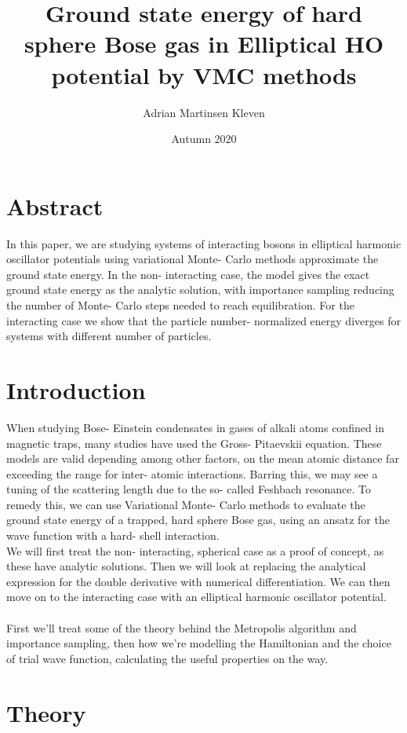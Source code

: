 \documentclass[11pt,a4paper,titlepage]{article}
\title{Ground state energy of hard sphere Bose gas in Elliptical HO potential by VMC methods}
\author{Adrian Martinsen Kleven}
\date{Autumn 2020}
\begin{document}
\maketitle
\tableofcontents
\listoffigures
\listoftables
\clearpage
\section{Abstract}
In this paper, we are studying systems of interacting bosons in elliptical harmonic oscillator potentials using variational Monte- Carlo methods approximate the ground state energy. In the non- interacting case, the model gives the exact ground state energy as the analytic solution, with importance sampling reducing the number of Monte- Carlo steps needed to reach equilibration. For the interacting case we show that the particle number- normalized energy diverges for systems with different number of particles.

\section{Introduction}
When studying Bose- Einstein condensates in gases of alkali atoms confined in magnetic traps, many studies have used the Gross- Pitaevskii equation. These models are valid depending among other factors, on the mean atomic distance far exceeding the range for inter- atomic interactions. Barring this, we may see a tuning of the scattering length due to the so- called Feshbach resonance. To remedy this, we can use Variational Monte- Carlo methods to evaluate the ground state energy of a trapped, hard sphere Bose gas, using an ansatz for the wave function with a hard- shell interaction.\\We will first treat the non- interacting, spherical case as a proof of concept, as these have analytic solutions. Then we will look at replacing the analytical expression for the double derivative with numerical differentiation. We can then move on to the interacting case with an elliptical harmonic oscillator potential.\\\\First we'll treat some of the theory behind the Metropolis algorithm and importance sampling, then how we're modelling the Hamiltonian and the choice of trial wave function, calculating the useful properties on the way. 

\section{Theory}
\end{document}
